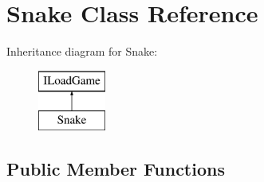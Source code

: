 \section{Snake Class Reference}
\label{class_snake}
Inheritance diagram for Snake\+:\begin{figure}[H]
\begin{center}
\leavevmode
\includegraphics[height=2.000000cm]{class_snake}
\end{center}
\end{figure}
\subsection*{Public Member Functions}
